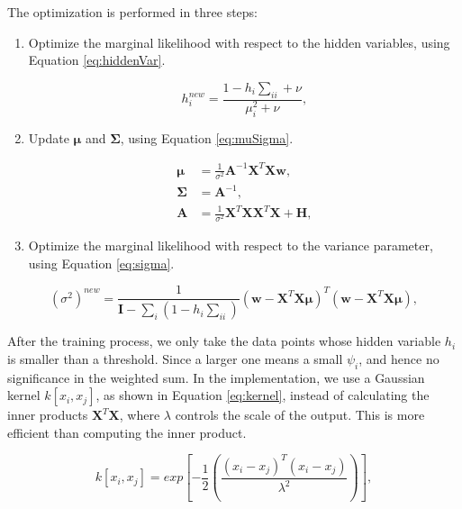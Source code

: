 \documentclass[12pt]{article}
\begin{document}
The optimization is performed in three steps:
\begin{enumerate}
\item Optimize the marginal likelihood with respect to the hidden variables, using Equation \ref{eq:hiddenVar}.

\begin{equation}
\label{eq:hiddenVar}
h_i^{new} = \frac{1 - h_i \sum_{ii} + \nu}{\mu^2_i + \nu},
\end{equation}

\item Update $\boldsymbol{\mu}$ and $\mathbf{\Sigma}$, using Equation \ref{eq:muSigma}.

\begin{equation}
\label{eq:muSigma}
\begin{split}
\boldsymbol{\mu} &= \frac{1}{\sigma^2} \mathbf{A}^{-1} \mathbf{X}^T \mathbf{X} \mathbf{w},\\
\mathbf{\Sigma} &= \mathbf{A}^{-1},\\
\mathbf{A} &= \frac{1}{\sigma^2} \mathbf{X}^T \mathbf{X} \mathbf{X}^T \mathbf{X} + \mathbf{H},
\end{split}
\end{equation}

\item Optimize the marginal likelihood with respect to the variance parameter, using Equation \ref{eq:sigma}.
\end{enumerate}
 
\begin{equation}
\label{eq:sigma}
(\sigma^2)^{new} = \frac{1}{\mathbf{I} - \sum_i ( 1 - h_i \sum_{ii})}  \left( \mathbf{w} - \mathbf{X}^T \mathbf{X} \boldsymbol{\mu} \right)^T \left( \mathbf{w} - \mathbf{X}^T \mathbf{X} \boldsymbol{\mu} \right),
\end{equation}

After the training process, we only take the data points whose hidden variable $h_i$ is smaller than a threshold. Since a larger one means a small $\psi_i$, and hence no significance in the weighted sum.
In the implementation, we use a Gaussian kernel $k[x_i,x_j]$, as shown in Equation \ref{eq:kernel}, instead of calculating the inner products $\mathbf{X}^T \mathbf{X}$, where $\lambda$ controls the scale of the output.
This is more efficient than computing the inner product.

\begin{equation}
\label{eq:kernel}
k[x_i, x_j] = exp \left[ - \frac{1}{2} \left( \frac{(x_i - x_j)^T (x_i - x_j)}{\lambda^2} \right) \right],
\end{equation}
\end{document}
